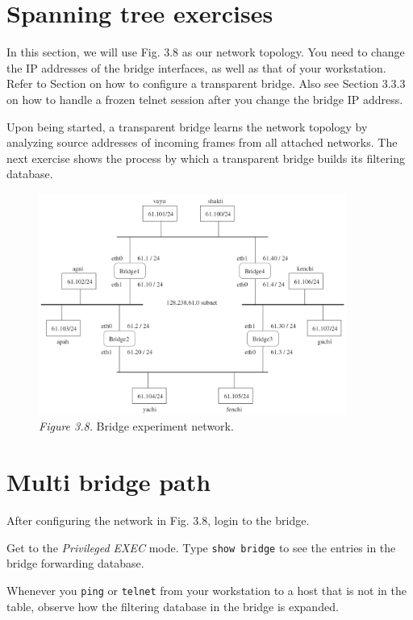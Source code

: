 \documentclass{../UTNetLab}
\begin{document}
\section*{Spanning tree exercises}
\label{sec:spanning-tree}
    In this section, we will use Fig. 3.8 as our network topology.
    You need to change the IP addresses of the bridge interfaces, as well as that of your workstation. Refer to Section      on how to configure a transparent bridge.
    Also see Section 3.3.3 on how to handle a frozen telnet session after you change the bridge IP address.

    Upon being started, a transparent bridge learns the network topology by analyzing source addresses of incoming frames from all attached networks.
    The next exercise shows the process by which a transparent bridge builds its filtering database.
    \begin{figure}[H]
        \centering
        \includegraphics[width=0.9\textwidth]{img/figure3-8.png}
        \caption{\textit{Figure 3.8.} Bridge experiment network.}
    \end{figure}

\section{Multi bridge path}
    After configuring the network in Fig. 3.8, login to the bridge.

    Get to the \textit{Privileged EXEC} mode. Type \lstinline[language={cisco}]{show bridge} to see the entries in the bridge forwarding database.

    Whenever you \lstinline{ping} or \lstinline{telnet} from your workstation to a host that is not in the table, observe how the filtering database in the bridge is expanded.
\end{document}
